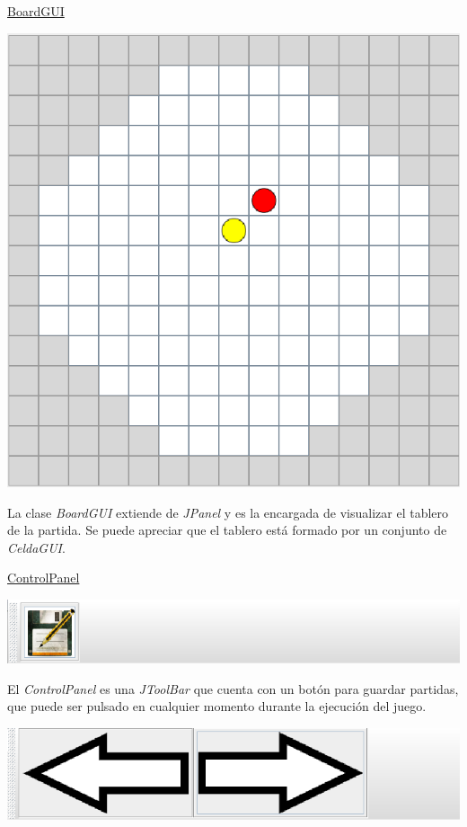 \documentclass[../DocumentoOficial.tex]{subfiles}
\begin{document}
\begin{sprint}[4]
\underline{BoardGUI}
\begin{center}
\includegraphics[scale=0.3]{board-gui-cubos-sprint3.png}
\end{center}

La clase \textit{BoardGUI} extiende de \textit{JPanel} y es la encargada de visualizar el tablero de la partida. Se puede apreciar que el tablero está formado por un conjunto de \textit{CeldaGUI}.

\underline{ControlPanel}
\begin{center}
\includegraphics[scale=0.8]{control-panel-sprint3.png}
\end{center}

El \textit{ControlPanel} es una \textit{JToolBar} que cuenta con un botón para guardar partidas, que puede ser pulsado en cualquier momento durante la ejecución del juego.

\begin{center}
\includegraphics[scale=0.8]{control-panel-replay-sprint3.png}
\end{center}


\end{sprint}
\end{document}

